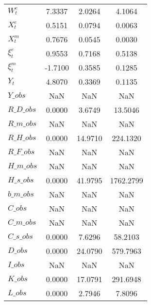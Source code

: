 \begin{center}
\begin{longtable}{lccc}
$ W^e_t                     $	 & 	       7.3337	 & 	       2.0264	 & 	       4.1064 \\ 
$ X^e_t                     $	 & 	       0.5151	 & 	       0.0794	 & 	       0.0063 \\ 
$ X^m_t                     $	 & 	       0.7676	 & 	       0.0545	 & 	       0.0030 \\ 
$ \xi^e_t                   $	 & 	       0.9553	 & 	       0.7168	 & 	       0.5138 \\ 
$  \xi^m_t                  $	 & 	      -1.7100	 & 	       0.3585	 & 	       0.1285 \\ 
$ Y_t                       $	 & 	       4.8070	 & 	       0.3369	 & 	       0.1135 \\ 
$Y\_obs                     $	 & 	          NaN	 & 	          NaN	 & 	          NaN \\ 
$R\_D\_obs                  $	 & 	       0.0000	 & 	       3.6749	 & 	      13.5046 \\ 
$R\_m\_obs                  $	 & 	          NaN	 & 	          NaN	 & 	          NaN \\ 
$R\_H\_obs                  $	 & 	       0.0000	 & 	      14.9710	 & 	     224.1320 \\ 
$R\_F\_obs                  $	 & 	          NaN	 & 	          NaN	 & 	          NaN \\ 
$H\_m\_obs                  $	 & 	          NaN	 & 	          NaN	 & 	          NaN \\ 
$H\_s\_obs                  $	 & 	       0.0000	 & 	      41.9795	 & 	    1762.2799 \\ 
$b\_m\_obs                  $	 & 	          NaN	 & 	          NaN	 & 	          NaN \\ 
$C\_obs                     $	 & 	          NaN	 & 	          NaN	 & 	          NaN \\ 
$C\_m\_obs                  $	 & 	          NaN	 & 	          NaN	 & 	          NaN \\ 
$C\_s\_obs                  $	 & 	       0.0000	 & 	       7.6296	 & 	      58.2103 \\ 
$D\_obs                     $	 & 	       0.0000	 & 	      24.0790	 & 	     579.7963 \\ 
$I\_obs                     $	 & 	          NaN	 & 	          NaN	 & 	          NaN \\ 
$K\_obs                     $	 & 	       0.0000	 & 	      17.0791	 & 	     291.6948 \\ 
$L\_obs                     $	 & 	       0.0000	 & 	       2.7946	 & 	       7.8096 \\ 

\end{longtable}
\end{center}
